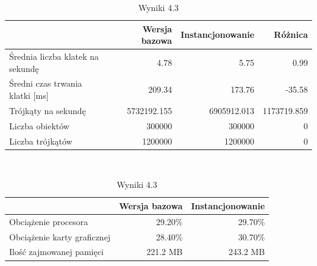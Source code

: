 \documentclass[a4paper,twoside,12pt]{book}
\begin{document}
\begin{table}[H]
    \centering
    \caption{Wyniki 4.3}
    \label{tab:instancing_test3}
    \begin{tabular}{|l||r|r|r|}
        \hline
        & Wersja bazowa & Instancjonowanie & Różnica \\
        \hline
        Średnia liczba klatek na sekundę & 4.78 & 5.75 & 0.99 \\
        \hline
        Średni czas trwania klatki [ms] & 209.34 & 173.76 & -35.58 \\
        \hline
        Trójkąty na sekundę & 5732192.155 & 6905912.013 & 1173719.859 \\
        \hline
        Liczba obiektów & 300000 & 300000 & 0 \\
        \hline
        Liczba trójkątów & 1200000 & 1200000 & 0 \\
        \hline
    \end{tabular} \\
    
    \vspace*{0.5 cm}
    
    \begin{tabular}{|l||r|r|}
         \hline
        & Wersja bazowa & Instancjonowanie \\
         \hline
        Obciążenie procesora & 29.20\% & 29.70\% \\
        \hline
        Obciążenie karty graficznej & 28.40\% & 30.70\% \\
        \hline
        Ilość zajmowanej pamięci & 221.2 MB & 243.2 MB \\
        \hline
    \end{tabular}
\end{table}

\vbox{}
\end{document}
